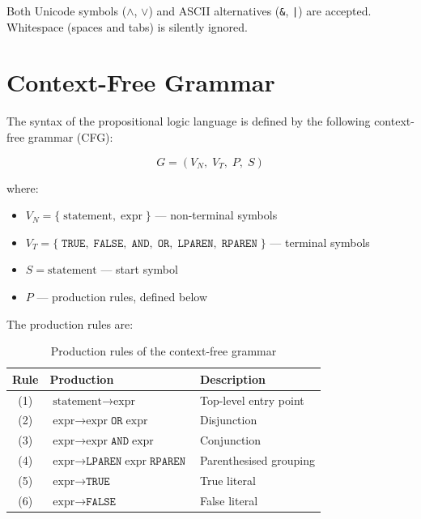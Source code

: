 Both Unicode symbols ($\wedge$, $\vee$) and ASCII alternatives (\texttt{\&}, \texttt{|}) are accepted. Whitespace (spaces and tabs) is silently ignored.

\section{Context-Free Grammar}

The syntax of the propositional logic language is defined by the following context-free grammar (CFG):

\begin{equation}
G = (V_N,\; V_T,\; P,\; S)
\end{equation}

where:
\begin{itemize}
    \item $V_N = \{\; \text{statement},\; \text{expr}\; \}$ --- non-terminal symbols
    \item $V_T = \{\; \texttt{TRUE},\; \texttt{FALSE},\; \texttt{AND},\; \texttt{OR},\; \texttt{LPAREN},\; \texttt{RPAREN}\; \}$ --- terminal symbols
    \item $S = \text{statement}$ --- start symbol
    \item $P$ --- production rules, defined below
\end{itemize}

The production rules are:

\begin{table}[H]
\centering
\caption{Production rules of the context-free grammar}
\label{table:grammar_rules}
\begin{tabular}{@{}cll@{}}
\toprule
Rule & Production & Description \\
\midrule
(1) & $\text{statement} \rightarrow \text{expr}$                        & Top-level entry point \\
(2) & $\text{expr} \rightarrow \text{expr}\;\texttt{OR}\;\text{expr}$   & Disjunction \\
(3) & $\text{expr} \rightarrow \text{expr}\;\texttt{AND}\;\text{expr}$  & Conjunction \\
(4) & $\text{expr} \rightarrow \texttt{LPAREN}\;\text{expr}\;\texttt{RPAREN}$ & Parenthesised grouping \\
(5) & $\text{expr} \rightarrow \texttt{TRUE}$                           & True literal \\
(6) & $\text{expr} \rightarrow \texttt{FALSE}$                          & False literal \\
\bottomrule
\end{tabular}
\end{table}


